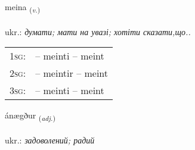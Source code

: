 \documentclass[frontgrid, backgrid]{flacards}\usepackage[]{graphicx}\usepackage[]{xcolor}
\begin{document}
\renewcommand{\flhead}{\vskip5pt \fboxsep=0pt {\small\bfseries\footnotesize Sagnorð | дієслово}}
\renewcommand{\fcfoot}{\vskip5pt \fboxsep=0pt \hspace{2pt}{\small\bfseries\footnotesize 2K}}

\renewcommand{\blhead}{\vskip5pt {\small\bfseries\footnotesize Sagnorð | дієслово }}
\renewcommand{\bcfoot}{\vskip5pt \hspace{2pt}{\small\bfseries\footnotesize 2K}}


{meina \small{\textsubscript{(\textit{v.})}} \\[1ex] %
\textphonetic{[meiːna]} \\
ukr.: \emph{думати; мати на увазі; хотіти сказати,що..} \\  [2ex]
\renewcommand*{\arraystretch}{0.8}
\begin{tabular}{p{1cm}l}
\textsc{1sg}: &  -- meinti -- meint \\ 
\textsc{2sg}: &  -- meintir -- meint \\ 
\textsc{3sg}: &  -- meinti -- meint \\ 
\end{tabular}
}

\renewcommand{\flhead}{\vskip5pt \fboxsep=0pt {\small\bfseries\footnotesize Lýsingarorð | прикметник}}
\renewcommand{\fcfoot}{\vskip5pt \fboxsep=0pt \hspace{2pt}{\small\bfseries\footnotesize 2K}}

\renewcommand{\blhead}{\vskip5pt {\small\bfseries\footnotesize Lýsingarorð | прикметник }}
\renewcommand{\bcfoot}{\vskip5pt \hspace{2pt}{\small\bfseries\footnotesize 2K}}


{ánægður \small{\textsubscript{(\textit{adj.})}} \\[1ex] %
\textphonetic{[auːnaiɣðʏr]} \\
ukr.: \emph{задоволений; радий} \\  [2ex]
\renewcommand*{\arraystretch}{0.8}
}
\end{document}
